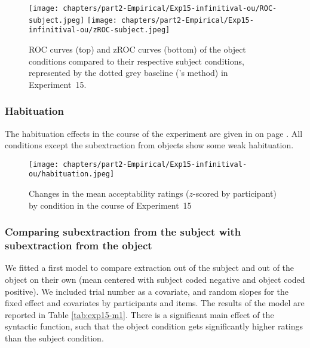 \begin{figure}[h]
    \centering
    \texttt{[image: chapters/part2-Empirical/Exp15-infinitival-ou/ROC-subject.jpeg]}
    \texttt{[image: chapters/part2-Empirical/Exp15-infinitival-ou/zROC-subject.jpeg]}
    \caption{ROC curves (top) and zROC curves (bottom) of the object conditions compared to their respective subject conditions, represented by the dotted grey baseline (\citealt{Dillon.2019}'s method) in Experiment~15.}
    \label{fig:exp15-ROC-subj}
\end{figure}

\pagebreak
\subsubsection{Habituation} 

The habituation effects in the course of the experiment are given in  on page \pageref{fig:exp15-habituation}. All conditions except the subextraction from objects show some weak habituation. 

\begin{figure}
    \centering
    \texttt{[image: chapters/part2-Empirical/Exp15-infinitival-ou/habituation.jpeg]}
    \caption{Changes in the mean acceptability ratings ($z$-scored by participant) by condition in the course of Experiment~15}
    \label{fig:exp15-habituation}
\end{figure}

\subsubsection{Comparing subextraction from the subject with subextraction from the object}

We fitted a first model to compare extraction out of the subject and out of the object on their own (mean centered with subject coded negative and object coded positive). We included trial number as a covariate, and random slopes for the fixed effect and covariates by participants and items. The results of the model are reported in Table \ref{tab:exp15-m1}. 
There is a significant main effect of the syntactic function, such that the object condition gets significantly higher ratings than the subject condition.



